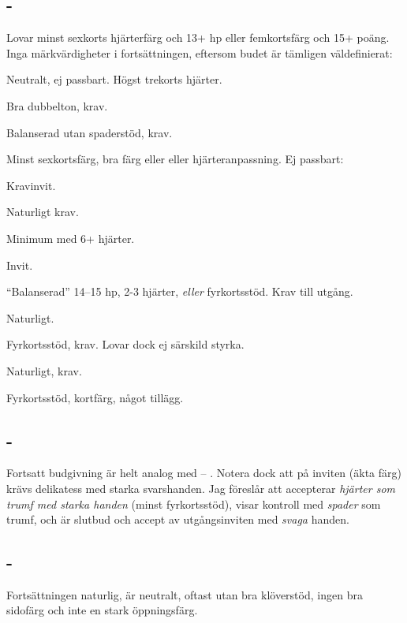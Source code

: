 \subsection{ - }

Lovar minst sexkorts hjärterfärg och 13+ hp eller femkortsfärg och 15+ poäng. 
Inga märk\-vär\-dig\-he\-ter i fortsättningen,
eftersom budet är tämligen väl\-de\-fi\-ni\-e\-rat:

\bbe
   \item[\hj{2}] Neutralt, ej passbart. Högst trekorts hjärter. 
	\bbe
	   \item[--\spa{2}] Bra dubbelton, krav.
	   \item[--\NT{2}] Balanserad utan spaderstöd, krav.
	\ebe
   \item[\spa{2}] Minst sexkortsfärg, bra färg eller eller hjärteranpassning.
		 Ej passbart: 
		\bbe
		   \item[--\NT{2}] Kravinvit.
		   \item[--\la{3}] Naturligt krav.
		   \item[--\hj{3}] Minimum med 6+ hjärter.
		   \item[--\spa{3}] Invit.
		\ebe
   \item[\NT{2}] ``Balanserad'' 14--15 hp, 2-3 hjärter, {\em eller}
fyrkortsstöd. Krav till utgång. 
   \item[\la{3}] Naturligt.
   \item[\hj{3}] Fyrkortsstöd, krav. Lovar dock ej särskild styrka.
   \item[\spa{3}] Naturligt, krav.
   \item[\la{4}] Fyrkortsstöd, kortfärg, något tillägg. 
\ebe

\subsection{ - }

Fortsatt budgivning är helt analog med  -- . Notera dock att på
inviten  (äkta färg) krävs delikatess med starka svarshanden. Jag
föreslår att  accepterar \emph{hjärter som trumf med starka handen} (minst
fyrkortsstöd),  visar kontroll med \emph{spader} som trumf, och 
är slutbud och accept av utgångsinviten med \emph{svaga} handen. 

\subsection{ - }

Fortsättningen naturlig,  är neutralt, oftast utan bra klöverstöd,
ingen bra 
sidofärg och inte en stark öppningsfärg.
